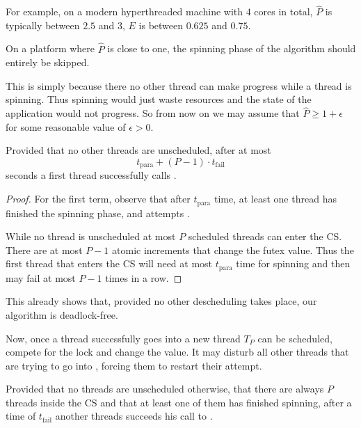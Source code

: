 For example, on a modern hyperthreaded machine with $4$ cores in
total, $\widehat{P}$ is typically between $2.5$ and $3$, $E$ is
between $0.625$ and $0.75$.

\begin{remark}
On a platform where $\widehat{P}$ is close to one, the spinning
phase of the algorithm should entirely be skipped.
\end{remark}

This is simply because there no other thread can make progress
while a thread is spinning. Thus spinning would just waste
resources and the state of the application would not progress.  So
from now on we may assume that $\widehat{P} \geq 1+\epsilon$ for some
reasonable value of $\epsilon > 0$.

\begin{lemma}
Provided that no other threads are unscheduled, after at most
$$t_{\textrm{para}} + (P-1)\cdot t_{\textrm{fail}}$$
seconds a first thread successfully calls .
\end{lemma}

\begin{proof}
For the first term, observe that after $t_{\textrm{para}}$ time,
at least one thread has finished the spinning phase, and attempts
.

While no thread is unscheduled at most $P$ scheduled threads can
enter the CS. There are at most $P-1$ atomic
increments that change the futex value. Thus the first thread that
enters the CS will need at most $t_{\textrm{para}}$
time for spinning and then  may fail at most $P-1$
times in a row.
\end{proof}

This already shows that, provided no other descheduling takes
place, our algorithm is deadlock-free.

Now, once a thread successfully goes into  a new
thread $T_P$ can be scheduled, compete for the lock and change the
 value. It may disturb all other threads that are trying to
go into , forcing them to restart their attempt.

\begin{remark}
Provided that no threads are unscheduled otherwise, that there are
always $P$ threads inside the CS and that at least one of them has
finished spinning, after a time of $t_{\textrm{fail}}$ another
threads succeeds his call to .
\end{remark}

